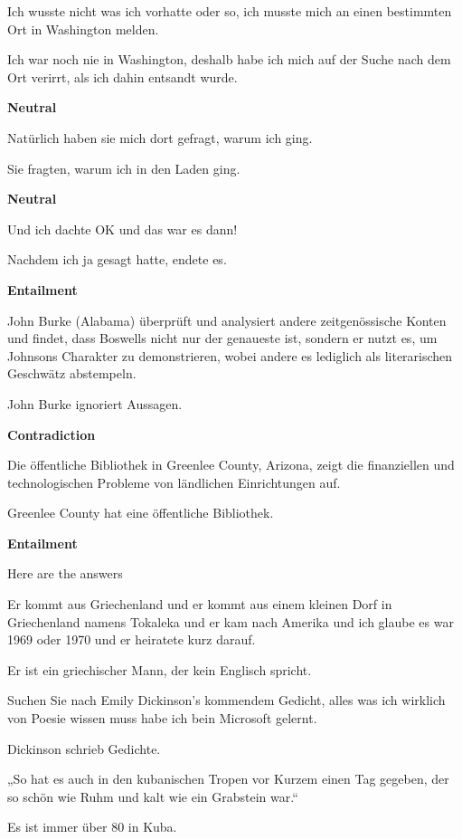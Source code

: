 \begin{examples}
  \label{ex:xnli}
  \item Ich wusste nicht was ich vorhatte oder so, ich musste mich an einen bestimmten Ort in Washington melden.

        Ich war noch nie in Washington, deshalb habe ich mich auf der Suche nach dem Ort verirrt, als ich dahin entsandt wurde.

        \textbf{Neutral}
  \item Natürlich haben sie mich dort gefragt, warum ich ging.

        Sie fragten, warum ich in den Laden ging.

        \textbf{Neutral}
  \item Und ich dachte OK und das war es dann!

        Nachdem ich ja gesagt hatte, endete es.

        \textbf{Entailment}
  \item John Burke (Alabama) überprüft und analysiert andere zeitgenössische Konten und findet, dass Boswells nicht nur der genaueste ist, sondern er nutzt es, um Johnsons Charakter zu demonstrieren, wobei andere es lediglich als literarischen Geschwätz abstempeln.

        John Burke ignoriert Aussagen.

        \textbf{Contradiction}
  \item Die öffentliche Bibliothek in Greenlee County, Arizona, zeigt die finanziellen und technologischen Probleme von ländlichen Einrichtungen auf.

        Greenlee County hat eine öffentliche Bibliothek.

        \textbf{Entailment}
\end{examples}

Here are the answers

\begin{examples}
  \item \label{itm:xnli1} Er kommt aus Griechenland und er kommt aus einem kleinen Dorf in Griechenland namens Tokaleka und er kam nach Amerika und ich glaube es war 1969 oder 1970 und er heiratete kurz darauf.

        Er ist ein griechischer Mann, der kein Englisch spricht.
  \item \label{itm:xnli2} Suchen Sie nach Emily Dickinson's kommendem Gedicht, alles was ich wirklich von Poesie wissen muss habe ich bein Microsoft gelernt.

        Dickinson schrieb Gedichte.
  \item \label{itm:xnli3} „So hat es auch in den kubanischen Tropen vor Kurzem einen Tag gegeben, der so schön wie Ruhm und kalt wie ein Grabstein war.“

        Es ist immer über 80 in Kuba.
\end{examples}

